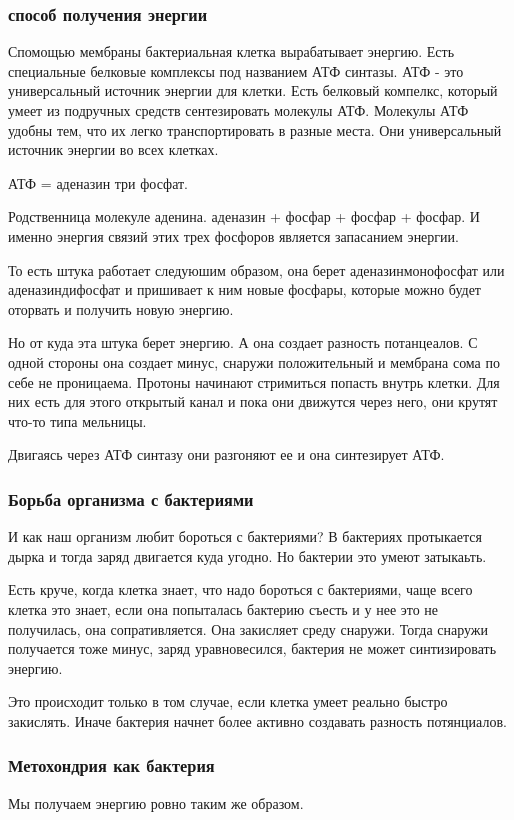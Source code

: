 \subsubsection{способ получения энергии}
Спомощью мембраны бактериальная клетка вырабатывает энергию. Есть
специальные белковые комплексы под названием АТФ синтазы. АТФ - это
универсальный источник энергии для клетки. Есть белковый компелкс,
который умеет из подручных средств сентезировать молекулы АТФ.
Молекулы АТФ удобны тем, что их легко транспортировать в разные места.
Они универсальный источник энергии во всех клетках.

АТФ = аденазин три фосфат.

Родственница молекуле аденина. аденазин + фосфар + фосфар + фосфар. И именно
энергия связий этих трех фосфоров является запасанием энергии.

То есть штука работает следуюшим образом, она берет аденазинмонофосфат или 
аденазиндифосфат и пришивает к ним новые фосфары, которые можно будет оторвать
и получить новую энергию.

Но от куда эта штука берет энергию. А она создает разность потанцеалов. С одной
стороны она создает минус, снаружи положительный и мембрана сома по себе не
проницаема. Протоны начинают стримиться попасть внутрь клетки. Для них есть
для этого открытый канал и пока они движутся через него, они крутят что-то типа мельницы.

Двигаясь через АТФ синтазу они разгоняют ее и она синтезирует АТФ.

\subsubsection{Борьба организма с бактериями}
И как наш организм любит бороться с бактериями? В бактериях протыкается
дырка и тогда заряд двигается куда угодно. Но бактерии это умеют затыкаьть.

Есть круче, когда клетка знает, что надо бороться с бактериями, чаще всего клетка это
знает, если она попыталась бактерию съесть и у нее это не получилась, она сопративляется.
Она закисляет среду снаружи. Тогда снаружи получается тоже минус, заряд
уравновесился, бактерия не может синтизировать энергию.

Это происходит только в том случае, если клетка умеет реально быстро закислять. Иначе бактерия
начнет более активно создавать разность потянциалов.

\subsubsection{Метохондрия как бактерия}
Мы получаем энергию ровно таким же образом.

